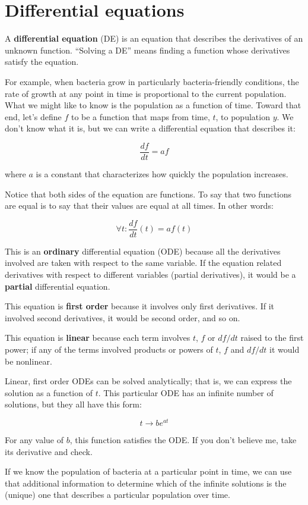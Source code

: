\documentclass{book}
\begin{document}
\section{Differential equations}

A {\bf differential equation} (DE) is an equation that describes the
derivatives of an unknown function. ``Solving a DE'' means finding a
function whose derivatives satisfy the equation.

For example, when bacteria grow in particularly bacteria-friendly
conditions, the rate of growth at any point in time is proportional to
the current population. What we might like to know is the population
as a function of time. Toward that end, let's define $f$ to be a
function that maps from time, $t$, to population $y$. We don't
know what it is, but we can write a differential equation
that describes it:

\[ \frac{df}{dt} = a f \]

where $a$ is a constant that characterizes how quickly the population
increases.

Notice that both sides of the equation are functions. To say that
two functions are equal is to say that their values are equal at
all times. In other words:

\[ \forall t: \frac{df}{dt}(t) = a f(t) \]

This is an {\bf ordinary} differential equation (ODE) because all the
derivatives involved are taken with respect to the
same variable. If the equation related derivatives with respect to
different variables (partial derivatives), it would be a {\bf partial}
differential equation.

This equation is {\bf first order} because it involves only first
derivatives. If it involved second derivatives, it would be second order,
and so on.

This equation is {\bf linear} because each term involves $t$, $f$ or
$df/dt$ raised to the first power; if any of the terms involved
products or powers of $t$, $f$ and $df/dt$ it would be
nonlinear.

Linear, first order ODEs can be solved analytically; that is, we
can express the solution as a function of $t$.
This particular ODE has an infinite number of solutions, but
they all have this form:

\[ t \to b e^{at} \]

For any value of $b$, this function satisfies the ODE. If you don't
believe me, take its derivative and check.

If we know the population of bacteria at a particular point in time,
we can use that additional information to determine which of the
infinite solutions is the (unique) one that describes a particular
population over time.
\end{document}
